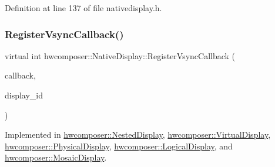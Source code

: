 Definition at line 137 of file nativedisplay.\+h.


\begin{DoxyCode}{0}
\end{DoxyCode}
\mbox{\label{classhwcomposer_1_1NativeDisplay_a0732e4b24a348aaf1e0b801b9a5f3c39}} 
\subsubsection{\texorpdfstring{Register\+Vsync\+Callback()}{RegisterVsyncCallback()}}
{\footnotesize\ttfamily virtual int hwcomposer\+::\+Native\+Display\+::\+Register\+Vsync\+Callback (\begin{DoxyParamCaption}\item[{std\+::shared\+\_\+ptr$<$ \mbox{\hyperlink{classhwcomposer_1_1VsyncCallback}{Vsync\+Callback}} $>$}]{callback,  }\item[{uint32\+\_\+t}]{display\+\_\+id }\end{DoxyParamCaption})\hspace{0.3cm}{\ttfamily [pure virtual]}}



Implemented in \mbox{\hyperlink{classhwcomposer_1_1NestedDisplay_a09a16cff82bc26e862eaa2e8bb9cbe67}{hwcomposer\+::\+Nested\+Display}}, \mbox{\hyperlink{classhwcomposer_1_1VirtualDisplay_ac7c9e2ca6a7f2e4f4acef44e4dd14ea6}{hwcomposer\+::\+Virtual\+Display}}, \mbox{\hyperlink{classhwcomposer_1_1PhysicalDisplay_ac003447bfca005292fc052d5b573869e}{hwcomposer\+::\+Physical\+Display}}, \mbox{\hyperlink{classhwcomposer_1_1LogicalDisplay_af99c6d2e779060cb006ee5d0039386da}{hwcomposer\+::\+Logical\+Display}}, and \mbox{\hyperlink{classhwcomposer_1_1MosaicDisplay_ab95984da914029b9dd2c5fb728926dbc}{hwcomposer\+::\+Mosaic\+Display}}.

\mbox{\label{classhwcomposer_1_1NativeDisplay_abce90b16515ced50d859da54b34ed4f0}} 
